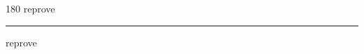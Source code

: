 
\begin{frame}
\begin{center}
\begin{turn}{180}
{\fontsize{2.5cm}{1em}\selectfont reprove}
\end{turn}
\vspace{1em}\par  
\hrule
\vspace{1em}\par  
{\fontsize{2.5cm}{1em}\selectfont reprove}
\end{center}
\end{frame}
